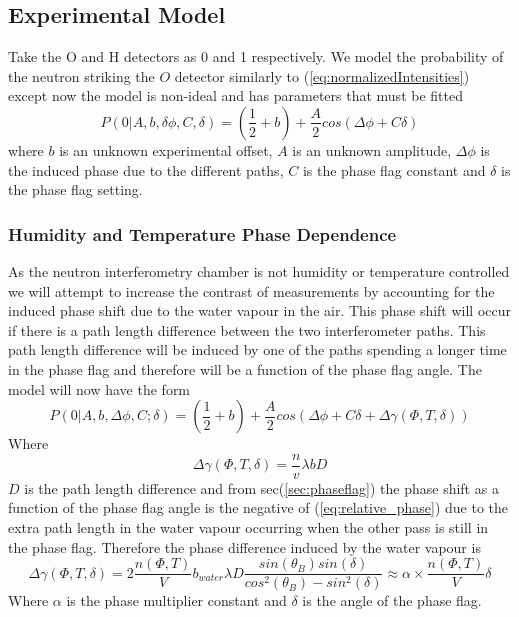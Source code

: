 \subsection{Experimental Model}
Take the O and H detectors as 0 and 1 respectively. We model the probability of the neutron striking the $O$ detector similarly to (\ref{eq:normalizedIntensities}) except now the model is non-ideal and has parameters that must be fitted
\begin{equation}
P(0|A,b,\delta\phi,C,\delta) = (\frac{1}{2}+b) + \frac{A}{2}cos(\Delta\phi+C\delta)
\label{eq:model1}
\end{equation}
where $b$ is an unknown experimental offset, $A$ is an unknown amplitude, $\Delta\phi$ is the induced phase due to the different paths, $C$ is the phase flag constant and $\delta$ is the phase flag setting. 
\subsubsection{Humidity and Temperature Phase Dependence}
As the neutron interferometry chamber is not humidity or temperature controlled we will attempt to increase the contrast of measurements by accounting for the induced phase shift due to the water vapour in the air. This phase shift will occur if there is a path length difference between the two interferometer paths. This path length difference will be induced by one of the paths spending a longer time in the phase flag and therefore will be a function of the phase flag angle. The model will now have the form 
\begin{equation}
P(0|A,b,\Delta\phi,C;\delta) = (\frac{1}{2}+b) + \frac{A}{2}cos(\Delta\phi+C\delta+\Delta\gamma(\Phi,T,\delta))
\end{equation}
Where 
\begin{equation*}
\Delta\gamma(\Phi,T,\delta) = \frac{n}{v}\lambda b D
\end{equation*}
$D$ is the path length difference and from sec(\ref{sec:phaseflag}) the phase shift as a function of the phase flag angle is the negative of (\ref{eq:relative_phase}) due to the extra path length in the water vapour occurring when the other pass is still in the phase flag. Therefore the phase difference induced by the water vapour is 
\begin{equation}
\Delta\gamma(\Phi,T,\delta)= 2\frac{n(\Phi,T)}{V}b_{water}\lambda D\frac{sin(\theta_B)sin(\delta)}{cos^2(\theta_B)-sin^2(\delta)} \approx \alpha \times \frac{n(\Phi,T)}{V}\delta 
\label{eq:phasewater}
\end{equation}
Where $\alpha$ is the phase multiplier constant and $\delta$ is the angle of the phase flag.

